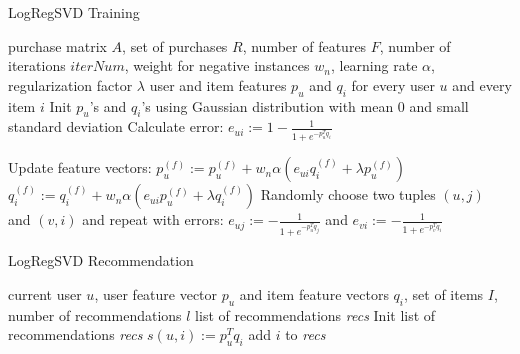 \documentclass[10pt]{reportMaster}
\begin{document}
\begin{algorithm}
	\caption{LogRegSVD Training}
	\label{alg:LogRegSVDTraining}
	\begin{algorithmic}[1]
		\Require purchase matrix $A$, set of purchases $R$, number of features $F$, number of iterations $iterNum$, weight for negative instances $w_n$, learning rate $\alpha$, regularization factor $\lambda$
		\Ensure user and item features $p_u$ and $q_i$ for every user $u$ and every item $i$
		\State Init $p_u$'s and $q_i$'s using Gaussian distribution with mean $0$ and small standard deviation
				\State Calculate error:
				\State $e_{ui} := 1 - \frac{1}{1 + e^{-p_u^Tq_i}}$
				
				\State Update feature vectors:
					\State $p_u^{(f)} := p_u^{(f)} + w_n \alpha (e_{ui} q_i^{(f)} + \lambda p_u^{(f)})$
					\State $q_i^{(f)} := q_i^{(f)} + w_n \alpha (e_{ui} p_u^{(f)} + \lambda q_i^{(f)})$
				\EndFor	
				\State Randomly choose two tuples $(u,j)$ and $(v,i)$ and repeat with errors: 
				\State $e_{uj} := - \frac{1}{1 + e^{-p_u^Tq_j}}$ and
				\State $e_{vi} := - \frac{1}{1 + e^{-p_v^Tq_i}}$
			\EndFor
		\EndFor
	\end{algorithmic}	
\end{algorithm}


\begin{algorithm}
	\caption{LogRegSVD Recommendation}
	\label{alg:LogRegSVDRecommendation}
	\begin{algorithmic}[1]
		\Require current user $u$, user feature vector $p_u$ and item feature vectors $q_i$, set of items $I$, number of recommendations $l$
		\Ensure list of recommendations \textit{recs}
		\State Init list of recommendations \textit{recs}
			\State $s(u,i) := p_u^Tq_i$
			\State add $i$ to \textit{recs}
			\EndIf
		\EndFor
	\end{algorithmic}	
\end{algorithm}
\end{document}
